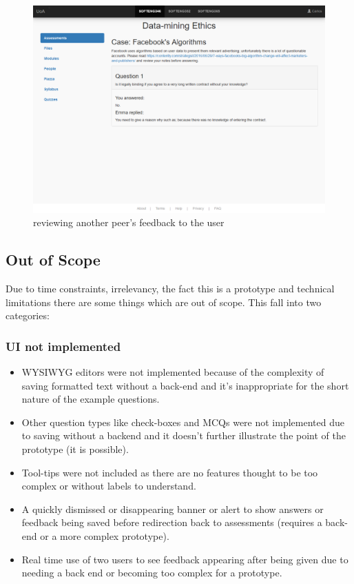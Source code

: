 \documentclass[10pt,a4paper]{article}
\begin{document}
	\begin{figure}[H]
		\centering
		\includegraphics[width=\textwidth]{5 - Data-mining Ethics.PNG}
		\caption{reviewing another peer's feedback to the user}
		\label{fig:five}
	\end{figure}

	\subsection*{Out of Scope}
	Due to time constraints, irrelevancy, the fact this is a prototype and technical limitations there are some things which are out of scope. This fall into two categories:
		\subsubsection*{UI not implemented}
			\begin{itemize}
				\item WYSIWYG editors were not implemented because of the complexity of saving formatted text without a back-end and it's inappropriate for the short nature of the example questions.
				\item Other question types like check-boxes and MCQs were not implemented due to saving without a backend and it doesn't further illustrate the point of the prototype (it is possible).
				\item Tool-tips were not included as there are no features thought to be too complex or without labels to understand.		
				\item A quickly dismissed or disappearing banner or alert to show answers or feedback being saved before redirection back to assessments (requires a back-end or a more complex prototype).
				\item Real time use of two users to see feedback appearing after being given due to needing a back end or becoming too complex for a prototype.
			\end{itemize}
\end{document}
